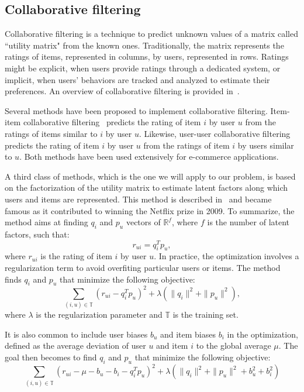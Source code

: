 \documentclass[10pt, conference, compsocconf]{IEEEtran}
\newcommand{\todo}[1]{\marginpar{\parbox{18mm}{\flushleft\tiny\color{red}\textbf{TODO}:
      #1}}}
\begin{document}
\todo{Restrict to binary classification}

\subsection{Collaborative filtering}

Collaborative filtering is a technique to predict unknown values of a 
matrix called ``utility matrix" from the known ones. Traditionally, the 
matrix represents the ratings of items, represented in columns, by 
users, represented in rows. Ratings might be explicit, when users 
provide ratings through a dedicated system, or implicit, when users' 
behaviors are tracked and analyzed to estimate their preferences. An 
overview of collaborative filtering is provided 
in~\cite{leskovec2014mining}.

Several methods have been proposed to implement collaborative 
filtering. Item-item collaborative filtering~\cite{breese1998empirical, linden2003amazon} predicts 
the rating of item $i$ by user $u$ from the ratings of items similar to 
$i$ by user $u$. Likewise, user-user collaborative 
filtering~\cite{breese1998empirical} predicts the rating of item $i$ by user $u$ 
from the ratings of item $i$ by users similar to $u$. Both methods
have been used extensively for e-commerce applications.

A third class of methods, which is the one we will apply to our 
problem, is based on the factorization of the utility matrix to 
estimate latent factors along which users and items are represented. 
This method is described 
in~\cite{koren2009matrix} and became famous as it contributed to winning the 
Netflix prize in 2009. To summarize, the method aims at finding $q_i$ 
and $p_u$ vectors of $\mathbb{R}^f$, where $f$ is the number of latent factors, such that:
\begin{equation*}
r_{ui} = q_i^Tp_u,
\end{equation*}
where $r_{ui}$ is the rating of item $i$ by user $u$. In practice, the optimization
involves a regularization term to avoid overfiting particular users or items. The method
finds $q_i$ and $p_u$ that minimize the following objective:
\begin{equation*}
\sum_{(i,u) \in \mathbb{T}}\left( r_{ui} - q_i^Tp_u\right)^2+\lambda \left( \|{q_i}\|^2 + \|{p_u}\|^2\right)
,
\end{equation*}
where $\lambda$ is the regularization parameter and $\mathbb{T}$ is the training set.

It is also common to include user biases $b_u$ and item biases $b_i$ in 
the optimization, defined as the average deviation of user $u$ and item 
$i$ to the global average $\mu$. The goal then becomes to find $q_i$ and $p_u$ that minimize the 
following objective:
\begin{equation*}
\sum_{(i,u) \in \mathbb{T}}\left( r_{ui} - \mu - b_u - b_i - q_i^Tp_u\right)^2+\lambda \left( \|{q_i}\|^2 + \|{p_u}\|^2 + b_u^2 + b_i^2\right)
\end{equation*}
\end{document}
